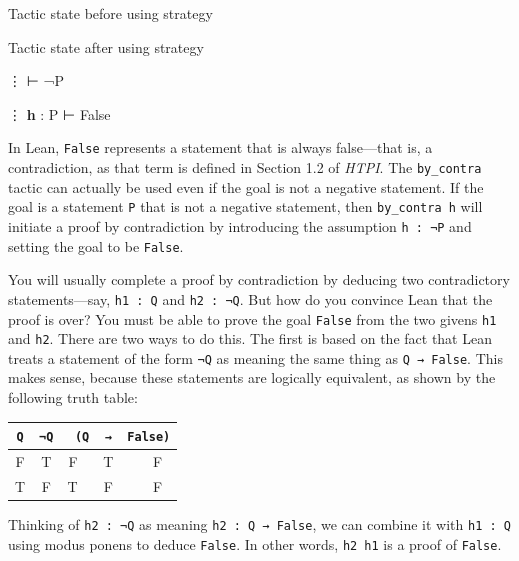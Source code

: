 \documentclass[
  letterpaper,
  DIV=11,
  numbers=noendperiod]{scrreprt}
\newenvironment{Shaded}{\begin{snugshade}}{\end{snugshade}}
\newcommand{\InformationTok}[1]{\textcolor[rgb]{0.37,0.37,0.37}{#1}}
\newcommand{\NormalTok}[1]{\textcolor[rgb]{0.00,0.23,0.31}{#1}}
\newcommand{\SpecialCharTok}[1]{\textcolor[rgb]{0.37,0.37,0.37}{#1}}
\renewcommand{\SpecialCharTok}[1]{}
\renewcommand{\InformationTok}[1]{\textcolor[HTML]{D2691E}{\textbf{#1}}}
\begin{document}
Tactic state before using strategy

Tactic state after using strategy

\begin{Shaded}
\begin{Highlighting}[]
\SpecialCharTok{{-}}\NormalTok{ ⋮}
\NormalTok{⊢ ¬P}
\end{Highlighting}
\end{Shaded}

\begin{Shaded}
\begin{Highlighting}[]
\SpecialCharTok{{-}}\NormalTok{ ⋮}
\InformationTok{h }\NormalTok{: P}
\NormalTok{⊢ False}
\end{Highlighting}
\end{Shaded}

In Lean, \texttt{False} represents a statement that is always
false---that is, a contradiction, as that term is defined in Section 1.2
of \emph{HTPI}. The \texttt{by\_contra} tactic can actually be used even
if the goal is not a negative statement. If the goal is a statement
\texttt{P} that is not a negative statement, then \texttt{by\_contra\ h}
will initiate a proof by contradiction by introducing the assumption
\texttt{h\ :\ ¬P} and setting the goal to be \texttt{False}.

You will usually complete a proof by contradiction by deducing two
contradictory statements---say, \texttt{h1\ :\ Q} and
\texttt{h2\ :\ ¬Q}. But how do you convince Lean that the proof is over?
You must be able to prove the goal \texttt{False} from the two givens
\texttt{h1} and \texttt{h2}. There are two ways to do this. The first is
based on the fact that Lean treats a statement of the form \texttt{¬Q}
as meaning the same thing as \texttt{Q\ →\ False}. This makes sense,
because these statements are logically equivalent, as shown by the
following truth table:

\begin{longtable}[]{@{}ccrcl@{}}
\toprule()
\texttt{Q} & \texttt{¬Q} & \texttt{(Q} & \texttt{→} & \texttt{False)} \\
\midrule()
\endhead
F & T & F ~ & T & ~~~ F \\
T & F & T ~ & F & ~~~ F \\
\bottomrule()
\end{longtable}

Thinking of \texttt{h2\ :\ ¬Q} as meaning \texttt{h2\ :\ Q\ →\ False},
we can combine it with \texttt{h1\ :\ Q} using modus ponens to deduce
\texttt{False}. In other words, \texttt{h2\ h1} is a proof of
\texttt{False}.
\end{document}
